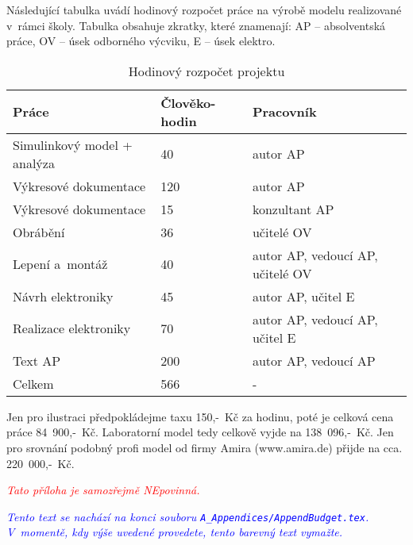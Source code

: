 Následující tabulka uvádí hodinový rozpočet práce na výrobě modelu realizované v~rámci školy. Tabulka obsahuje zkratky, které znamenají\?: AP -- absolventská práce, OV -- úsek odborného výcviku, E -- úsek elektro.

\begin{table}[H]
  \centering
  \caption{Hodinový rozpočet projektu}\label{tab:hodinovy-rozpocet}
    \begin{tabular}{|l|p{2cm}|l|}
        \hline
        \textbf{Práce}                          & \textbf{Člověko-hodin}   & \textbf{Pracovník} \\ \hline \hline
        {Simulinkový model + analýza}           & {40}          & {autor AP} \\ \hline
        {Výkresové dokumentace}                 & {120}         & {autor AP} \\ \hline
        {Výkresové dokumentace}                 & {15}          & {konzultant AP} \\ \hline
        {Obrábění}                              & {36}          & {učitelé OV} \\ \hline
        {Lepení a~montáž}                       & {40}          & {autor AP, vedoucí AP, učitelé OV} \\ \hline
        {Návrh elektroniky}                     & {45}          & {autor AP, učitel E} \\ \hline
        {Realizace elektroniky}                 & {70}          & {autor AP, vedoucí AP, učitel E} \\ \hline
        {Text AP}                               & {200}         & {autor AP, vedoucí AP} \\ \hline \hline
        {Celkem}                                & {566}         & {-}\\ \hline
    \end{tabular}
\end{table}

Jen pro ilustraci předpokládejme taxu 150,-~Kč za hodinu, poté je celková cena prá\-ce 84~900,-~Kč. Laboratorní model tedy celkově vyjde na 138~096,-~Kč. Jen pro srov\-ná\-ní podobný profi model od firmy Amira (www.amira.de) přijde na cca. 220~000,-~Kč.





\textcolor{red}{\em Tato příloha je samozřejmě NEpovinná.\/}

\textcolor{blue}{\em Tento text se nachází na konci souboru \texttt{A\_Appendices/AppendBudget.tex}. V~momentě, kdy výše uvedené provedete, tento barevný text vymažte.\/} 
